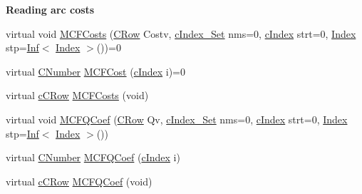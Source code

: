 \begin{Indent}\textbf{ Reading arc costs}\par
\begin{DoxyCompactItemize}
\item 
virtual void \mbox{\hyperlink{class_m_c_f_class_ab6dbac4cde9477589de653081986abb4}{M\+C\+F\+Costs}} (\mbox{\hyperlink{class_m_c_f_class_a62409402be4e4b301e1a568f99f877be}{C\+Row}} Costv, \mbox{\hyperlink{class_m_c_f_class_a81575b2d4e4d5636b17170432150ae69}{c\+Index\+\_\+\+Set}} nms=0, \mbox{\hyperlink{class_m_c_f_class_a76aaabb20535c51a2752b93f6c38fe54}{c\+Index}} strt=0, \mbox{\hyperlink{class_m_c_f_class_ad53d6229d7ec28555a9c9c2fd9abf773}{Index}} stp=\mbox{\hyperlink{class_o_p_ttypes__di__unipi__it_1_1_inf}{Inf}}$<$ \mbox{\hyperlink{class_m_c_f_class_ad53d6229d7ec28555a9c9c2fd9abf773}{Index}} $>$())=0
\item 
virtual \mbox{\hyperlink{class_m_c_f_class_a24d0627ba8213afe1ec4ebeb4508e8f1}{C\+Number}} \mbox{\hyperlink{class_m_c_f_class_ac666df7c1e7ed07c0f7574ec307c9e82}{M\+C\+F\+Cost}} (\mbox{\hyperlink{class_m_c_f_class_a76aaabb20535c51a2752b93f6c38fe54}{c\+Index}} i)=0
\item 
virtual \mbox{\hyperlink{class_m_c_f_class_ab700102e9ba8bb6015be6818d4e99097}{c\+C\+Row}} \mbox{\hyperlink{class_m_c_f_class_a75dcdf78883ef28452a4698aaa6bf14b}{M\+C\+F\+Costs}} (void)
\item 
virtual void \mbox{\hyperlink{class_m_c_f_class_acd08873d1e15db41bf42648226f8feb1}{M\+C\+F\+Q\+Coef}} (\mbox{\hyperlink{class_m_c_f_class_a62409402be4e4b301e1a568f99f877be}{C\+Row}} Qv, \mbox{\hyperlink{class_m_c_f_class_a81575b2d4e4d5636b17170432150ae69}{c\+Index\+\_\+\+Set}} nms=0, \mbox{\hyperlink{class_m_c_f_class_a76aaabb20535c51a2752b93f6c38fe54}{c\+Index}} strt=0, \mbox{\hyperlink{class_m_c_f_class_ad53d6229d7ec28555a9c9c2fd9abf773}{Index}} stp=\mbox{\hyperlink{class_o_p_ttypes__di__unipi__it_1_1_inf}{Inf}}$<$ \mbox{\hyperlink{class_m_c_f_class_ad53d6229d7ec28555a9c9c2fd9abf773}{Index}} $>$())
\item 
virtual \mbox{\hyperlink{class_m_c_f_class_a24d0627ba8213afe1ec4ebeb4508e8f1}{C\+Number}} \mbox{\hyperlink{class_m_c_f_class_ab9227949082669e0e9ca0c545406f1f4}{M\+C\+F\+Q\+Coef}} (\mbox{\hyperlink{class_m_c_f_class_a76aaabb20535c51a2752b93f6c38fe54}{c\+Index}} i)
\item 
virtual \mbox{\hyperlink{class_m_c_f_class_ab700102e9ba8bb6015be6818d4e99097}{c\+C\+Row}} \mbox{\hyperlink{class_m_c_f_class_aeea78552d525e5ce61f3e3887774cc11}{M\+C\+F\+Q\+Coef}} (void)
\end{DoxyCompactItemize}
\end{Indent}
